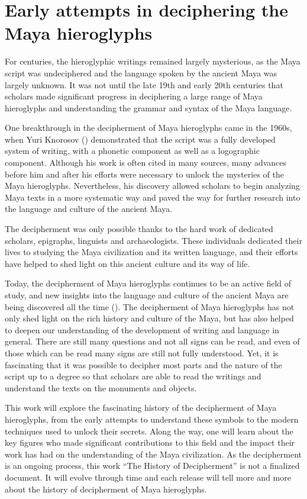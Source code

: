 \documentclass[../main.tex]{subfiles}
\begin{document}
\section{Early attempts in deciphering the Maya hieroglyphs}
For centuries, the hieroglyphic writings remained largely mysterious, as the Maya script was 
undeciphered and the language spoken by the ancient Maya was largely unknown.
It was not until the late 19th and early 20th centuries that scholars made significant progress 
in deciphering a large range of Maya hieroglyphs and understanding the grammar and syntax of 
the Maya language. 

One breakthrough in the decipherment of Maya hieroglyphs came in the 1960s, 
when Yuri Knorosov (\cite{knorozov1967}) demonstrated that the script was a fully developed 
system of writing, with a phonetic component as well as a logographic component. 
Although his work is often cited in many sources, many advances before him and after his efforts
were necessary to unlock the mysteries of the Maya hieroglyphs.
Nevertheless, his discovery allowed scholars to begin analyzing Maya texts in a more systematic 
way and paved the way for further research into the language and culture of the ancient Maya.

The decipherment was only possible thanks to the hard work of dedicated scholars, epigraphs, 
linguists and archaeologists. 
These individuals dedicated their lives to studying the Maya civilization and its written 
language, and their efforts have helped to shed light on this ancient culture and its way of life. 

Today, the decipherment of Maya hieroglyphs continues to be an active field of study, 
and new insights into the language and culture of the ancient Maya are being discovered 
all the time (\cite{zender2017}). 
The decipherment of Maya hieroglyphs has not only shed light on the rich history and culture of 
the Maya, but has also helped to deepen our understanding of the development of writing and 
language in general.
There are still many questions and not all signs can be read, and even of those which can be read
many signs are still not fully understood.
Yet, it is fascinating that it was possible to decipher most parts
and the nature of the script up to a degree so that scholars are able to read the writings and 
understand the texts on the monuments and objects.

This work will explore the fascinating history of the decipherment of Maya hieroglyphs, 
from the early attempts to understand these symbols to the modern techniques used to unlock 
their secrets. Along the way, one will learn about the key figures who made significant 
contributions to this field and the impact their work has had on the understanding of the 
Maya civilization.
As the decipherment is an ongoing process, this work ``The History of Decipherment'' is not a 
finalized document.
It will evolve through time and each release will tell more and more 
about the history of decipherment of Maya hieroglyphs.
\end{document}
